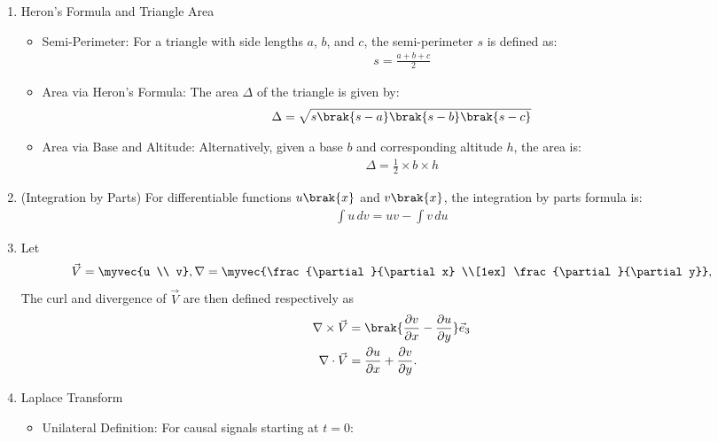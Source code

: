 \begin{enumerate}[label=\thesubsection.\arabic*, ref=\thesubsection.\theenumi,itemsep=0pt]
\item Heron's Formula and Triangle Area
\begin{itemize}
\item Semi-Perimeter: For a triangle with side lengths $a$, $b$, and $c$, the semi-perimeter $s$ is defined as:
\begin{align}
s = \frac{a + b + c}{2} \label{eq:semi_perimeter}
\end{align}
\item Area via Heron's Formula: The area $\Delta$ of the triangle is given by:
\begin{align}
\Delta = \sqrt{s\brak{s - a}\brak{s - b}\brak{s - c}} \label{eq:herons_formula}
\end{align}
\item Area via Base and Altitude: Alternatively, given a base $b$ and corresponding altitude $h$, the area is:
\begin{align}
\Delta = \frac{1}{2} \times b \times h \label{eq:triangle_area_base_alt}
\end{align}
\end{itemize}
\fi
%
\item (Integration by Parts)
For differentiable functions $u\brak{x}$ and $v\brak{x}$, the integration by parts formula is:
\begin{align}
\int u \, dv = u v - \int v \, du 
\label{eq:integration_by_parts}
\end{align}
%
\item Let
\begin{align}
	\vec{V}&=\myvec{u \\ v}, \nabla = \myvec{\frac{\partial }{\partial x} \\[1ex] \frac{\partial }{\partial y}},
	\\
\end{align}
The curl and divergence of $\vec{V}$ are then defined respectively as
\begin{align}
	\label{eq:curl}
    \nabla\times\vec{V}
    &=\brak{\frac{\partial v}{\partial x}
    -\frac{\partial u}{\partial y}}\vec{e}_3
    \\
    \nabla\cdot\vec{V}
    &=\frac{\partial u}{\partial x}
     +\frac{\partial v}{\partial y}.
	\label{eq:div}
\end{align}
%
\iffalse
\item Laplace Transform
\begin{itemize}
\item Unilateral Definition: For causal signals starting at $t = 0$:
\begin{align}

\end{align}
\end{itemize}
\end{enumerate}
